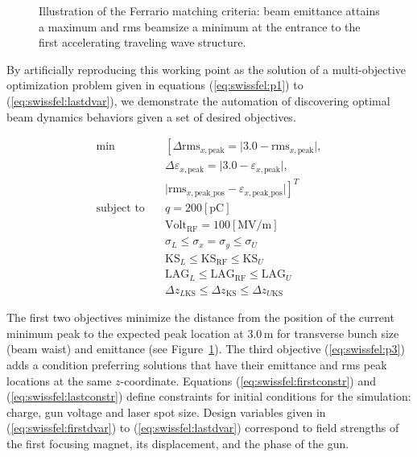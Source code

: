 \begin{figure}
  \centering
  
  \caption{Illustration of the Ferrario matching criteria: beam emittance
  attains a maximum and rms beamsize a minimum at the entrance to the first
  accelerating traveling wave structure.}
  \label{fig:fer_match}
\end{figure}

By artificially reproducing this working point as the solution of a
  multi-objective optimization problem given in equations
  (\ref{eq:swissfel:p1}) to (\ref{eq:swissfel:lastdvar}),
  we demonstrate the automation of discovering optimal beam dynamics behaviors
  given a set of desired objectives.

\begin{align}
  \text{min}  \quad & \left[ \Delta \text{rms}_{x,\text{peak}} = \vert 3.0 -
  \text{rms}_{x,\text{peak}} \vert, \right. \label{eq:swissfel:p1}\\
                    & \Delta \varepsilon_{x,\text{peak}}  = \vert 3.0 -
                    \varepsilon_{x,\text{peak}} \vert, \label{eq:swissfel:p2}\\
                    & \left. \vert \text{rms}_{x, \text{peak\_pos}} -
                    \varepsilon_{x,\text{peak\_pos}} \vert
                    \label{eq:swissfel:p3} \right]^T\\
  \text{subject to} \quad & q = 200 \left[\text{pC}\right] \label{eq:swissfel:firstconstr}\\
              \quad & \text{Volt}_{\text{RF}} = 100 \left[\text{MV/m}\right] \label{eq:swissfel:lastconstr}\\
              \quad & \sigma_{L} \leq \sigma_x = \sigma_y \leq \sigma_{U} \label{eq:swissfel:firstdvar}\\
              \quad & \text{KS}_{L} \leq \text{KS}_{\text{RF}} \leq \text{KS}_{U} \label{eq:swissfel:seconddvar}\\
              \quad & \text{LAG}_{L} \leq \text{LAG}_{\text{RF}} \leq \text{LAG}_{U} \\
              \quad & \Delta z_{L\text{KS}} \leq \Delta z_{\text{KS}} \leq \Delta z_{U\text{KS}} \label{eq:swissfel:lastdvar}
\end{align}

The first two objectives minimize the distance from the position of the current
  minimum peak to the expected peak location at $3.0$\,m for transverse bunch
  size (beam waist) and emittance (see Figure~\ref{fig:fer_match}).
The third objective (\ref{eq:swissfel:p3}) adds a condition preferring
  solutions that have their emittance and rms peak locations at the same
  $z$-coordinate.
Equations (\ref{eq:swissfel:firstconstr}) and (\ref{eq:swissfel:lastconstr})
  define constraints for initial conditions for the simulation: charge,
  gun voltage and laser spot size.
Design variables given in (\ref{eq:swissfel:firstdvar}) to
  (\ref{eq:swissfel:lastdvar}) correspond to field strengths of the
  first focusing magnet, its displacement, and the phase of the gun.

